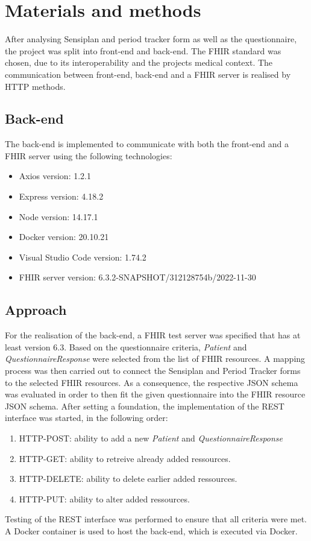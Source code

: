 \documentclass[
a4paper,
11pt
]{article}
\begin{document}
	\section{Materials and methods}
	
	After analysing Sensiplan\textsuperscript{\textcopyright} and period tracker form as well as the questionnaire, the project was split into front-end and back-end.  The \ac{FHIR} standard was chosen, due to its interoperability and the projects medical context. The communication between front-end, back-end and a \ac{FHIR} server is realised by \ac{HTTP} methods.
	
	\subsection{Back-end}
	The back-end is implemented to communicate with both the front-end and a \ac{FHIR} server using the following technologies:
	\begin{itemize}
		\item Axios version: 1.2.1
		\item \ac{Express} version: 4.18.2
		\item \ac{Node} version: 14.17.1
		\item Docker version: 20.10.21
		\item Visual Studio Code version: 1.74.2
		\item \ac{FHIR} server version: 6.3.2-SNAPSHOT/312128754b/2022-11-30
	\end{itemize}
	\newpage
	\subsection*{Approach}
	For the realisation of the back-end, a \ac{FHIR} test server was specified that has at least version 6.3. Based on the questionnaire criteria, \textit{Patient} and \textit{QuestionnaireResponse} were selected from the list of \ac{FHIR} resources. A mapping process was then carried out to connect the Sensiplan\textsuperscript{\textcopyright} and Period Tracker forms to the selected \ac{FHIR} resources. As a consequence, the respective \ac{JSON} schema was evaluated in order to then fit the given questionnaire into the \ac{FHIR} resource \ac{JSON} schema. After setting a foundation, the implementation of the \ac{REST} interface was started, in the following order:
	\begin{enumerate}
		\item \ac{HTTP}-POST: ability to add a new \textit{Patient} and \textit{QuestionnaireResponse}
		\item \ac{HTTP}-GET: ability  to retreive already added ressources.
		\item \ac{HTTP}-DELETE: ability to delete earlier added ressources.
		\item \ac{HTTP}-PUT: ability to alter added ressources.
	\end{enumerate}
	Testing of the \ac{REST} interface was performed to ensure that all criteria were met. A Docker container is used to host the back-end, which is executed via Docker.
	
\end{document}
